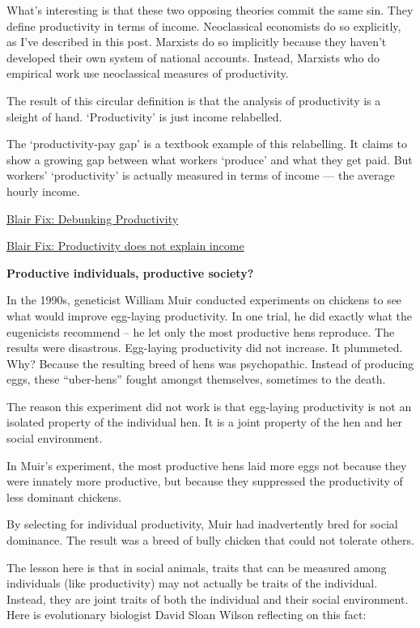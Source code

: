 \documentclass[
]{book}
\begin{document}
What's interesting is that these two opposing theories commit the same sin. They define productivity in terms of income. Neoclassical economists do so explicitly, as I've described in this post. Marxists do so implicitly because they haven't developed their own system of national accounts. Instead, Marxists who do empirical work use neoclassical measures of productivity.

The result of this circular definition is that the analysis of productivity is a sleight of hand. `Productivity' is just income relabelled.

The `productivity-pay gap' is a textbook example of this relabelling. It claims to show a growing gap between what workers `produce' and what they get paid. But workers' `productivity' is actually measured in terms of income --- the average hourly income.

\href{https://economicsfromthetopdown.com/2020/01/17/debunking-the-productivity-pay-gap/amp/}{Blair Fix: Debunking Productivity}

\href{https://evonomics.com/no-productivity-does-not-explain-income/}{Blair Fix: Productivity does not explain income}

\textbf{Productive individuals, productive society?}

In the 1990s, geneticist William Muir conducted experiments on chickens to see what would
improve egg-laying productivity.
In one trial, he did exactly what the eugenicists recommend -- he let only the most productive hens
reproduce. The results were disastrous. Egg-laying productivity did not increase.
It plummeted. Why? Because the resulting breed of hens was psychopathic.
Instead of producing eggs, these ``uber-hens'' fought amongst themselves, sometimes to the death.

The reason this experiment did not work is that egg-laying productivity is not an isolated
property of the individual hen.
It is a joint property of the hen and her social environment.

In Muir's experiment, the most productive hens laid more eggs not because they were innately
more productive, but because they suppressed the productivity of less dominant chickens.

By selecting for individual productivity, Muir had inadvertently bred for social dominance.
The result was a breed of bully chicken that could not tolerate others.

The lesson here is that in social animals, traits that can be measured among individuals (like
productivity) may not actually be traits of the individual.
Instead, they are joint traits of both the individual and their social environment.
Here is evolutionary biologist David Sloan Wilson reflecting on this fact:
\end{document}
